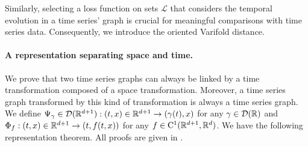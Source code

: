 Similarly, selecting a loss function on sets $\mathscr{L}$ that considers the temporal evolution in a time series' graph is crucial for meaningful comparisons with time series data. Consequently, we introduce the oriented Varifold distance. 
      
       \paragraph{A representation separating space and time.}
       We prove that two time series graphs can always be linked by a time transformation composed of a space transformation. Moreover, a time series graph transformed by this kind of transformation is always a time series graph.
        We define $\Psi_\gamma\in \mathcal{D}(\mathbb{R}^{d+1}) : (t,x)\in\mathbb{R}^{d+1}\to (\gamma(t),x)$ for any $\gamma\in \mathcal{D}(\mathbb{R})$ and $\Phi_f:  (t,x)\in\mathbb{R}^{d+1}\to (t,f(t,x)) $ for any $f\in \mathrm{C}^1(\mathbb{R}^{d+1},\mathbb{R}^d)$. 
        We have the following representation theorem.
        All proofs are given in . 


